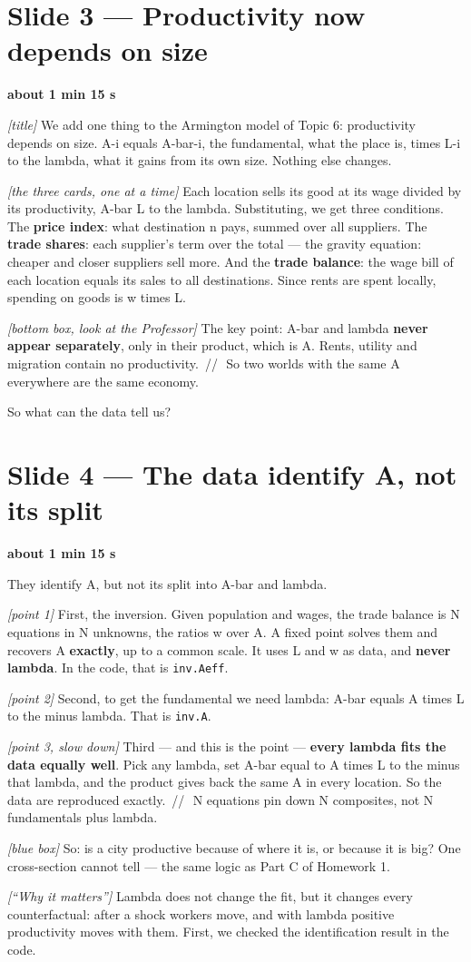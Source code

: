 \documentclass[11pt,a4paper]{article}
\newcommand{\slide}[2]{\Needspace{10\baselineskip}\section{#1}\textcolor{unicared}{\small\bfseries #2}\par}
\newcommand{\cue}[1]{{\small\itshape\color{unicared}[#1]}}
\newcommand{\pause}{\textcolor{unicared}{\,/\!/\,}}
\begin{document}
\slide{Slide 3 --- Productivity now depends on size}{about 1 min 15 s}
\begin{say}
\cue{title} We add one thing to the Armington model of Topic 6: productivity depends on size. A-i equals A-bar-i, the fundamental, what the place is, times L-i to the lambda, what it gains from its own size. Nothing else changes.

\cue{the three cards, one at a time} Each location sells its good at its wage divided by its productivity, A-bar L to the lambda. Substituting, we get three conditions. The \textbf{price index}: what destination n pays, summed over all suppliers. The \textbf{trade shares}: each supplier's term over the total --- the gravity equation: cheaper and closer suppliers sell more. And the \textbf{trade balance}: the wage bill of each location equals its sales to all destinations. Since rents are spent locally, spending on goods is w times L.

\cue{bottom box, look at the Professor} The key point: A-bar and lambda \textbf{never appear separately}, only in their product, which is A. Rents, utility and migration contain no productivity. \pause\ So two worlds with the same A everywhere are the same economy.

So what can the data tell us?
\end{say}

\slide{Slide 4 --- The data identify A, not its split}{about 1 min 15 s}
\begin{say}
They identify A, but not its split into A-bar and lambda.

\cue{point 1} First, the inversion. Given population and wages, the trade balance is N equations in N unknowns, the ratios w over A. A fixed point solves them and recovers A \textbf{exactly}, up to a common scale. It uses L and w as data, and \textbf{never lambda}. In the code, that is \texttt{inv.Aeff}.

\cue{point 2} Second, to get the fundamental we need lambda: A-bar equals A times L to the minus lambda. That is \texttt{inv.A}.

\cue{point 3, slow down} Third --- and this is the point --- \textbf{every lambda fits the data equally well}. Pick any lambda, set A-bar equal to A times L to the minus that lambda, and the product gives back the same A in every location. So the data are reproduced exactly. \pause\ N equations pin down N composites, not N fundamentals plus lambda.

\cue{blue box} So: is a city productive because of where it is, or because it is big? One cross-section cannot tell --- the same logic as Part C of Homework 1.

\cue{``Why it matters''} Lambda does not change the fit, but it changes every counterfactual: after a shock workers move, and with lambda positive productivity moves with them. First, we checked the identification result in the code.
\end{say}
\end{document}

